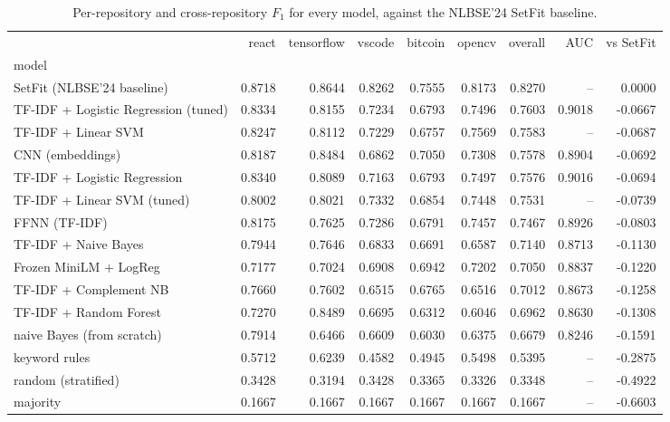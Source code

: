 \begin{table}[htbp]
  \centering
  \caption{Per-repository and cross-repository $F_1$ for every model, against the NLBSE'24 SetFit baseline.}
  \label{tab:final-leaderboard}
\begin{tabular}{lrrrrrrrr}
\toprule
 & react & tensorflow & vscode & bitcoin & opencv & overall & AUC & vs SetFit \\
model &  &  &  &  &  &  &  &  \\
\midrule
SetFit (NLBSE'24 baseline) & 0.8718 & 0.8644 & 0.8262 & 0.7555 & 0.8173 & 0.8270 & -- & 0.0000 \\
TF-IDF + Logistic Regression (tuned) & 0.8334 & 0.8155 & 0.7234 & 0.6793 & 0.7496 & 0.7603 & 0.9018 & -0.0667 \\
TF-IDF + Linear SVM & 0.8247 & 0.8112 & 0.7229 & 0.6757 & 0.7569 & 0.7583 & -- & -0.0687 \\
CNN (embeddings) & 0.8187 & 0.8484 & 0.6862 & 0.7050 & 0.7308 & 0.7578 & 0.8904 & -0.0692 \\
TF-IDF + Logistic Regression & 0.8340 & 0.8089 & 0.7163 & 0.6793 & 0.7497 & 0.7576 & 0.9016 & -0.0694 \\
TF-IDF + Linear SVM (tuned) & 0.8002 & 0.8021 & 0.7332 & 0.6854 & 0.7448 & 0.7531 & -- & -0.0739 \\
FFNN (TF-IDF) & 0.8175 & 0.7625 & 0.7286 & 0.6791 & 0.7457 & 0.7467 & 0.8926 & -0.0803 \\
TF-IDF + Naive Bayes & 0.7944 & 0.7646 & 0.6833 & 0.6691 & 0.6587 & 0.7140 & 0.8713 & -0.1130 \\
Frozen MiniLM + LogReg & 0.7177 & 0.7024 & 0.6908 & 0.6942 & 0.7202 & 0.7050 & 0.8837 & -0.1220 \\
TF-IDF + Complement NB & 0.7660 & 0.7602 & 0.6515 & 0.6765 & 0.6516 & 0.7012 & 0.8673 & -0.1258 \\
TF-IDF + Random Forest & 0.7270 & 0.8489 & 0.6695 & 0.6312 & 0.6046 & 0.6962 & 0.8630 & -0.1308 \\
naive Bayes (from scratch) & 0.7914 & 0.6466 & 0.6609 & 0.6030 & 0.6375 & 0.6679 & 0.8246 & -0.1591 \\
keyword rules & 0.5712 & 0.6239 & 0.4582 & 0.4945 & 0.5498 & 0.5395 & -- & -0.2875 \\
random (stratified) & 0.3428 & 0.3194 & 0.3428 & 0.3365 & 0.3326 & 0.3348 & -- & -0.4922 \\
majority & 0.1667 & 0.1667 & 0.1667 & 0.1667 & 0.1667 & 0.1667 & -- & -0.6603 \\
\bottomrule
\end{tabular}
\end{table}
